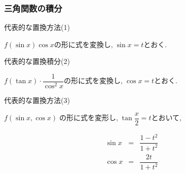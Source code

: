 \documentclass[a4paper]{jsarticle}
\begin{document}
\subsubsection{三角関数の積分}
\begin{itembox}[l]{代表的な置換方法(1)}
    \begin{center}
        $f\left(\sin x\right)\cos x$の形に式を変換し,$\; \sin x= t$とおく.
    \end{center}
\end{itembox}
\begin{itembox}[l]{代表的な置換積分(2)}
    \begin{center}
        $f\left(\tan x\right)\cdot \dfrac{1}{\cos^2 x}$の形に式を変換し,$\; \cos x= t$とおく.
    \end{center}
\end{itembox}
\begin{itembox}[l]{代表的な置換方法(3)}
    \begin{center}
        $f\left(\sin x,\cos x\right)\;$の形に式を変形し,$\; \tan\dfrac{x}{2}=t$とおいて,
    \end{center}
    \begin{eqnarray*}
        \sin x&=&\dfrac{1-t^2}{1+t^2}\\
        \cos x&=&\dfrac{2t}{1+t^2}\\
    \end{eqnarray*}
\end{itembox}
\end{document}
